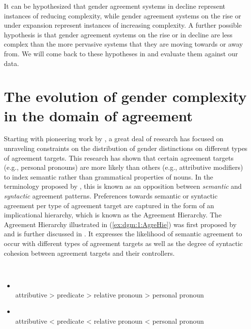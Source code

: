 \documentclass[output=collectionpaper]{langsci/langscibook}
\begin{document}
It can be hypothesized that gender agreement systems in decline represent instances of reducing complexity, while gender agreement systems on the rise or under expansion represent instances of increasing complexity. A further possible hypothesis is that gender agreement systems on the rise or in decline are less complex than the more pervasive systems that they are moving towards or away from. We will come back to these hypotheses in  and evaluate them against our data.



\section{The evolution of gender complexity in the domain of agreement}
\label{sec:dgm:EvAgr}
Starting with pioneering work by \citet{Corbett1979,Corbett1991}, a great deal of research has focused on unraveling constraints on the distribution of gender distinctions on different types of agreement targets. This research has shown that certain agreement targets (e.g., personal pronouns) are more likely than others (e.g., attributive modifiers) to index semantic rather than grammatical properties of nouns.
In the terminology proposed by \citet{Corbett1979,Corbett1991}, this is known as an opposition between \textit{semantic} and \textit{syntactic} agreement patterns. Preferences towards semantic or syntactic agreement per type of agreement target are captured in the form of an implicational hierarchy, which is known as the Agreement Hierarchy. The Agreement Hierarchy \textendash{} illustrated in (\ref{ex:dgm:1:AgreHie}) \textendash{} was first proposed by \citet{Corbett1979} and is further discussed in \citet{Corbett1991,Corbett2000,Corbett2006}. It expresses the likelihood of semantic agreement to occur with different types of agreement targets as well as the degree of syntactic cohesion between agreement targets and their controllers.

\ea\label{ex:dgm:1:AgreHie}
\\
\begin{itemize}

\item {}\\
attributive {\textgreater}  predicate  {\textgreater} relative pronoun {\textgreater} personal pronoun

\item {}\\
attributive  {\textless} predicate {\textless} relative pronoun {\textless}  personal pronoun

\end{itemize}
\z
\end{document}
